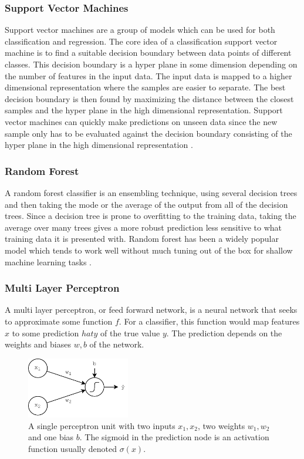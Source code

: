 \subsubsection*{Support Vector Machines}

Support vector machines are a group of models which can be used for both classification and regression. The core idea of a classification support vector machine is to find a suitable decision boundary between data points of different classes. This decision boundary is a hyper plane in some dimension depending on the number of features in the input data. The input data is mapped to a higher dimensional representation where the samples are easier to separate. The best decision boundary is then found by maximizing the distance between the closest samples and the hyper plane in the high dimensional representation. Support vector machines can quickly make predictions on unseen data since the new sample only has to be evaluated against the decision boundary consisting of the hyper plane in the high dimensional representation \citep{chollet2017deep}.   

\subsubsection*{Random Forest}

A random forest classifier is an ensembling technique, using several decision trees and then taking the mode or the average of the output from all of the decision trees. Since a decision tree is prone to overfitting to the training data, taking the average over many trees gives a more robust prediction less sensitive to what training data it is presented with. Random forest has been a widely popular model which tends to work well without much tuning out of the box for shallow machine learning tasks \citep{chollet2017deep}. 

\subsubsection*{Multi Layer Perceptron}

A multi layer perceptron, or feed forward network, is a neural network that seeks to approximate some function $f$. For a classifier, this function would map features $x$ to some prediction $hat{y}$ of the true value $y$. The prediction depends on the weights and biases $w,b$ of the network.  


\begin{figure}[H]
    \centering
    \includegraphics[width=0.4\textwidth]{Figures/figs-perceptron.pdf}
    \caption{A single perceptron unit with two inputs $x_1, x_2$, two weights $w_1, w_2$ and one bias $b$. The sigmoid in the prediction node is an activation function usually denoted $\sigma(x)$.}
    \label{fig:perceptron}
\end{figure}

